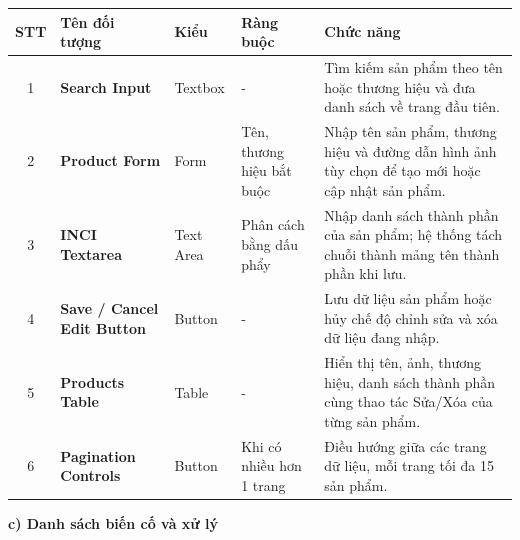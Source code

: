 \documentclass[12pt,a4paper]{article}
\begin{document}
\begin{center}
\renewcommand{\arraystretch}{1.5}
\begin{tabularx}{\textwidth}{|c|l|l|l|X|}
\hline
\rowcolor{blue!20}
\textbf{STT} & \textbf{Tên đối tượng} & \textbf{Kiểu} & \textbf{Ràng buộc} & \textbf{Chức năng} \\ \hline

1 & \textbf{Search Input} & Textbox & - & Tìm kiếm sản phẩm theo tên hoặc thương hiệu và đưa danh sách về trang đầu tiên. \\ \hline

2 & \textbf{Product Form} & Form & Tên, thương hiệu bắt buộc & Nhập tên sản phẩm, thương hiệu và đường dẫn hình ảnh tùy chọn để tạo mới hoặc cập nhật sản phẩm. \\ \hline

3 & \textbf{INCI Textarea} & Text Area & Phân cách bằng dấu phẩy & Nhập danh sách thành phần của sản phẩm; hệ thống tách chuỗi thành mảng tên thành phần khi lưu. \\ \hline

4 & \textbf{Save / Cancel Edit Button} & Button & - & Lưu dữ liệu sản phẩm hoặc hủy chế độ chỉnh sửa và xóa dữ liệu đang nhập. \\ \hline

5 & \textbf{Products Table} & Table & - & Hiển thị tên, ảnh, thương hiệu, danh sách thành phần cùng thao tác Sửa/Xóa của từng sản phẩm. \\ \hline

6 & \textbf{Pagination Controls} & Button & Khi có nhiều hơn 1 trang & Điều hướng giữa các trang dữ liệu, mỗi trang tối đa 15 sản phẩm. \\ \hline

\end{tabularx}
\end{center}

\textbf{c) Danh sách biến cố và xử lý}
\end{document}
